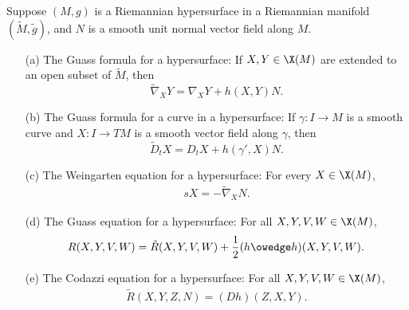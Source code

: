 \begin{theorem}
Suppose $(M,g)$ is a Riemannian hypersurface in a Riemannian manifold $(\widetilde{M},\tilde{g})$, and $N$ is a smooth unit normal vector field along $M$.
\begin{itemize}
\item[(a)] The Guass formula for a hypersurface: If $X,Y\in\X(M)$ are extended to an open subset of $\widetilde{M}$, then
\[\widetilde{\nabla}_XY=\nabla_XY+h(X,Y)N.\] 
\item[(b)] The Guass formula for a curve in a hypersurface: If $\gamma:I\to M$ is a smooth curve and $X:I\to TM$ is a smooth vector field along $\gamma$, then
\[\widetilde{D}_tX=D_tX+h(\gamma',X)N.\] 
\item[(c)] The Weingarten equation for a hypersurface: For every $X\in\X(M)$,
\begin{align}\label{Riemann Weigarten equation hypersurface}
sX=-\widetilde{\nabla}_XN.
\end{align}
\item[(d)] The Guass equation for a hypersurface: For all $X,Y,V,W\in\X(M)$,
\begin{align}\label{Riemann Guass equation hypersurface}
R(X,Y,V,W)=\tilde{R}(X,Y,V,W)+\frac{1}{2}(h\owedge h)(X,Y,V,W).
\end{align}
\item[(e)] The Codazzi equation for a hypersurface: For all $X,Y,V,W\in\X(M)$,
\begin{align}\label{Riemann Codazzi equation hypersurface}
\tilde{R}(X,Y,Z,N)=(Dh)(Z,X,Y).
\end{align}
\end{itemize}
\end{theorem}
